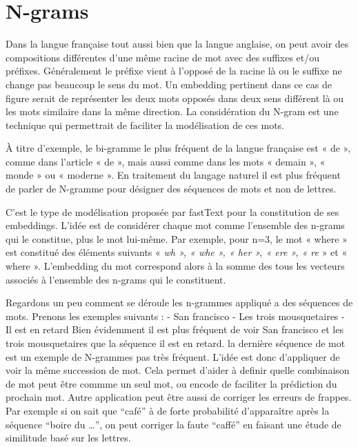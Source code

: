\documentclass[8pt]{article}
\begin{document}
    \hypertarget{n-grams}{%
\section{N-grams}\label{n-grams}}

    Dans la langue française tout aussi bien que la langue anglaise, on peut
avoir des compositions différentes d'une même racine de mot avec des
suffixes et/ou préfixes. Généralement le préfixe vient à l'opposé de la
racine là ou le suffixe ne change pas beaucoup le sens du mot. Un
embedding pertinent dans ce cas de figure serait de représenter les deux
mots opposés dans deux sens différent là ou les mots similaire dans la
même direction. La considération du N-gram est une technique qui
permettrait de faciliter la modélisation de ces mots.

À titre d'exemple, le bi-gramme le plus fréquent de la langue française
est « de », comme dans l'article « de », mais aussi comme dans les mots
« demain », « monde » ou « moderne ». En traitement du langage naturel
il est plus fréquent de parler de N-gramme pour désigner des séquences
de mots et non de lettres.

C'est le type de modélisation proposée par fastText pour la constitution
de ses embeddings. L'idée est de considérer chaque mot comme l'ensemble
des n-grams qui le constitue, plus le mot lui-même. Par exemple, pour
n=3, le mot « where » est constitué des éléments suivants « \emph{wh »,
« whe », « her », « ere », « re} » et « where ». L'embedding du mot
correspond alors à la somme des tous les vecteurs associés à l'ensemble
des n-grams qui le constituent.

    Regardons un peu comment se déroule les n-grammes appliqué a des
séquences de mots. Prenons les exemples suivants : - San francisco - Les
trois mousquetaires - Il est en retard Bien évidemment il est plus
fréquent de voir San francisco et les trois mousquetaires que la
séquence il est en retard. la dernière séquence de mot est un exemple de
N-grammes pas très fréquent. L'idée est donc d'appliquer de voir la même
succession de mot. Cela permet d'aider à definir quelle combinaison de
mot peut être commme un seul mot, ou encode de faciliter la prédiction
du prochain mot. Autre application peut être aussi de corriger les
erreurs de frappes. Par exemple si on sait que ``café'' à de forte
probabilité d'apparaître après la séquence ``boire du \ldots{}'', on
peut corriger la faute ``caffé'' en faisant une étude de similitude basé
sur les lettres.
\end{document}
